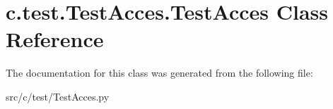\hypertarget{classc_1_1test_1_1_test_acces_1_1_test_acces}{}\section{c.\+test.\+Test\+Acces.\+Test\+Acces Class Reference}
\label{classc_1_1test_1_1_test_acces_1_1_test_acces}


The documentation for this class was generated from the following file\+:\begin{DoxyCompactItemize}
\item 
src/c/test/Test\+Acces.\+py\end{DoxyCompactItemize}
